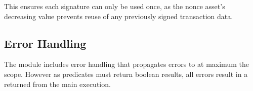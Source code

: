 This ensures each signature can only be used once, as the nonce asset's decreasing value prevents reuse of any previously
signed transaction data.

\subsection{Error Handling}
The module includes error handling that propagates errors to at maximum the  scope. However as predicates
must return boolean results, all errors result in a  returned from the main execution.



